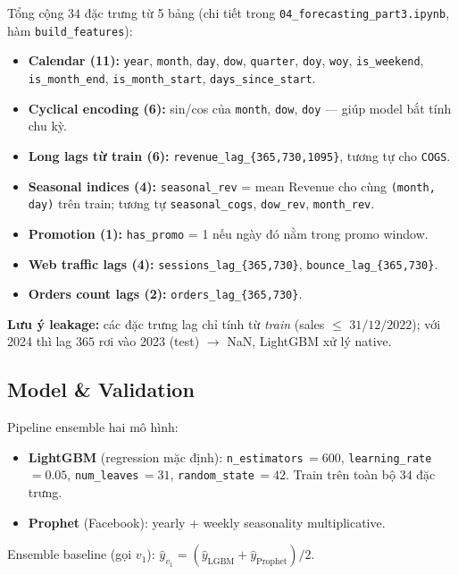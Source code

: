 \documentclass[10pt]{article}
\begin{document}
Tổng cộng $34$ đặc trưng từ 5 bảng (chi tiết trong \texttt{04\_forecasting\_part3.ipynb}, hàm \texttt{build\_features}):
\begin{itemize}\itemsep -0.2em
  \item \textbf{Calendar (11):} \texttt{year}, \texttt{month}, \texttt{day}, \texttt{dow}, \texttt{quarter}, \texttt{doy}, \texttt{woy}, \texttt{is\_weekend}, \texttt{is\_month\_end}, \texttt{is\_month\_start}, \texttt{days\_since\_start}.
  \item \textbf{Cyclical encoding (6):} sin/cos của \texttt{month}, \texttt{dow}, \texttt{doy} --- giúp model bắt tính chu kỳ.
  \item \textbf{Long lags từ train (6):} \texttt{revenue\_lag\_\{365,730,1095\}}, tương tự cho \texttt{COGS}.
  \item \textbf{Seasonal indices (4):} \texttt{seasonal\_rev} = mean Revenue cho cùng \texttt{(month, day)} trên train; tương tự \texttt{seasonal\_cogs}, \texttt{dow\_rev}, \texttt{month\_rev}.
  \item \textbf{Promotion (1):} \texttt{has\_promo} = 1 nếu ngày đó nằm trong promo window.
  \item \textbf{Web traffic lags (4):} \texttt{sessions\_lag\_\{365,730\}}, \texttt{bounce\_lag\_\{365,730\}}.
  \item \textbf{Orders count lags (2):} \texttt{orders\_lag\_\{365,730\}}.
\end{itemize}

\textbf{Lưu ý leakage:} các đặc trưng lag chỉ tính từ \emph{train} (sales $\le$ $31/12/2022$); với 2024 thì lag $365$ rơi vào 2023 (test) $\to$ NaN, LightGBM xử lý native.

\subsection{Model \& Validation}

Pipeline ensemble hai mô hình:
\begin{itemize}\itemsep -0.2em
  \item \textbf{LightGBM} (regression mặc định): \texttt{n\_estimators}\,$=600$, \texttt{learning\_rate}\,$=0.05$, \texttt{num\_leaves}\,$=31$, \texttt{random\_state}\,$=42$. Train trên toàn bộ $34$ đặc trưng.
  \item \textbf{Prophet} (Facebook): yearly + weekly seasonality multiplicative.
\end{itemize}
Ensemble baseline (gọi $v_1$): $\hat y_{v_1} = (\hat y_{\text{LGBM}} + \hat y_{\text{Prophet}})/2$.
\end{document}

